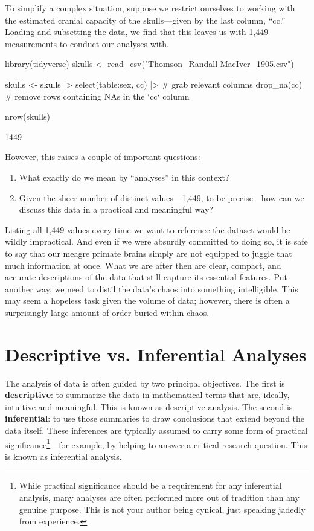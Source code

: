 

To simplify a complex situation, suppose we restrict ourselves to working with the estimated cranial capacity of the skulls—given by the last column, ``cc.'' Loading and subsetting the data, we find that this leaves us with 1,449 measurements to conduct our analyses with.

\begin{inR}
library(tidyverse)
skulls <- read_csv("Thomson_Randall-MacIver_1905.csv")

skulls <- skulls |> 
  select(table:sex, cc) |> # grab relevant columns
  drop_na(cc) # remove rows containing NAs in the `cc` column
  
nrow(skulls)
\end{inR}

\begin{outR}
[1] 1449
\end{outR}

\noindent
However, this raises a couple of important questions:

\begin{enumerate}
    \item What exactly do we mean by ``analyses'' in this context?
    \item Given the sheer number of distinct values—1,449, to be precise—how can we discuss this data in a practical and meaningful way?
\end{enumerate}

Listing all 1,449 values every time we want to reference the dataset would be wildly impractical. And even if we were absurdly committed to doing so, it is safe to say that our meagre primate brains simply are not equipped to juggle that much information at once. What we are after then are clear, compact, and accurate descriptions of the data that still capture its essential features. Put another way, we need to distil the data's chaos into something intelligible. This may seem a hopeless task given the volume of data; however, there is often a surprisingly large amount of order buried within chaos.

\section{Descriptive vs. Inferential Analyses}

The analysis of data is often guided by two principal objectives. The first is \textbf{descriptive}: to summarize the data in mathematical terms that are, ideally, intuitive and meaningful. This is known as \gls{descriptive analysis}. The second is \textbf{inferential}: to use those summaries to draw conclusions that extend beyond the data itself. These inferences are typically assumed to carry some form of practical significance\footnote{While practical significance should be a requirement for any inferential analysis, many analyses are often performed more out of tradition than any genuine purpose. This is not your author being cynical, just speaking jadedly from experience.}—for example, by helping to answer a critical research question. This is known as \gls{inferential analysis}.

